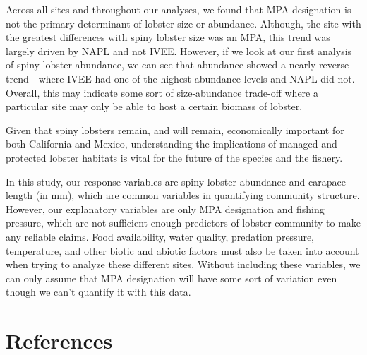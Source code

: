 \documentclass[]{article}
\begin{document}
Across all sites and throughout our analyses, we found that MPA
designation is not the primary determinant of lobster size or abundance.
Although, the site with the greatest differences with spiny lobster size
was an MPA, this trend was largely driven by NAPL and not IVEE. However,
if we look at our first analysis of spiny lobster abundance, we can see
that abundance showed a nearly reverse trend---where IVEE had one of the
highest abundance levels and NAPL did not. Overall, this may indicate
some sort of size-abundance trade-off where a particular site may only
be able to host a certain biomass of lobster.

Given that spiny lobsters remain, and will remain, economically
important for both California and Mexico, understanding the implications
of managed and protected lobster habitats is vital for the future of the
species and the fishery.

In this study, our response variables are spiny lobster abundance and
carapace length (in mm), which are common variables in quantifying
community structure. However, our explanatory variables are only MPA
designation and fishing pressure, which are not sufficient enough
predictors of lobster community to make any reliable claims. Food
availability, water quality, predation pressure, temperature, and other
biotic and abiotic factors must also be taken into account when trying
to analyze these different sites. Without including these variables, we
can only assume that MPA designation will have some sort of variation
even though we can't quantify it with this data.

\section{References}\label{references}
\end{document}
